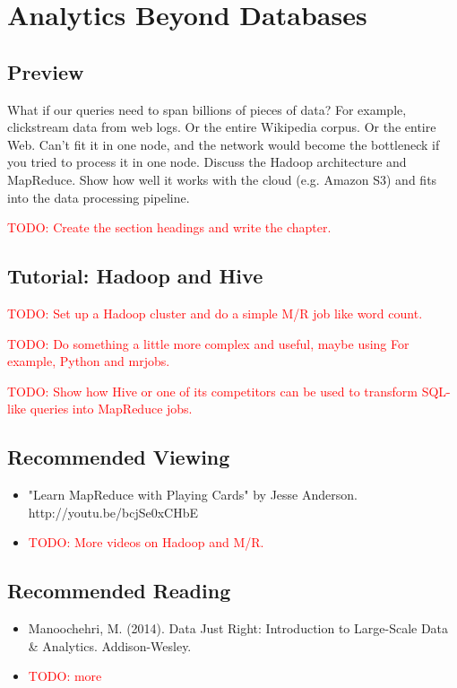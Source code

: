 \documentclass[11pt]{book}
\newcommand{\todo}[1]{\textcolor{red}{TODO: #1}} %
\begin{document}
\chapter{Analytics Beyond Databases}

\section*{Preview}

What if our queries need to span billions of pieces of data?  For example, clickstream data from web logs.  Or the entire Wikipedia corpus.  Or the entire Web.  Can't fit it in one node, and the network would become the bottleneck if you tried to process it in one node.  Discuss the Hadoop architecture and MapReduce.  Show how well it works with the cloud (e.g. Amazon S3) and fits into the data processing pipeline.

\todo{Create the section headings and write the chapter.}

\section{Tutorial: Hadoop and Hive}

\todo{Set up a Hadoop cluster and do a simple M/R job like word count.}

\todo{Do something a little more complex and useful, maybe using For example, Python and mrjobs.}

\todo{Show how Hive or one of its competitors can be used to transform SQL-like queries into MapReduce jobs.}

\section*{Recommended Viewing}
\begin{itemize}
    \item "Learn MapReduce with Playing Cards" by Jesse Anderson.\\  http://youtu.be/bcjSe0xCHbE
    \item \todo{More videos on Hadoop and M/R.}
\end{itemize}

\section*{Recommended Reading}
\begin{itemize}
    \item Manoochehri, M. (2014). Data Just Right: Introduction to Large-Scale Data \& Analytics. Addison-Wesley.
    \item \todo{more}
\end{itemize}
\end{document}
